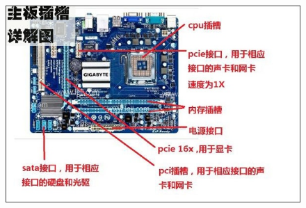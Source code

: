 \begin{frame}[fragile]
\begin{figure}[h] 
\centering
\includegraphics[width=\textwidth]{slide01/images/mobo}
\end{figure}
\end{frame}


